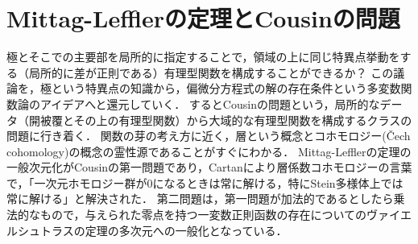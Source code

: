 \documentclass[uplatex, dvipdfmx]{jsreport}
\begin{document}
\section{Mittag-Lefflerの定理とCousinの問題}

\begin{tcolorbox}[colframe=ForestGreen, colback=ForestGreen!10!white,breakable,colbacktitle=ForestGreen!40!white,coltitle=black,fonttitle=\bfseries\sffamily,
title=]
    極とそこでの主要部を局所的に指定することで，領域の上に同じ特異点挙動をする（局所的に差が正則である）有理型関数を構成することができるか？
    この議論を，極という特異点の知識から，偏微分方程式の解の存在条件という多変数関数論のアイデアへと還元していく．
    するとCousinの問題という，局所的なデータ（開被覆とその上の有理型関数）から大域的な有理型関数を構成するクラスの問題に行き着く．
    関数の芽の考え方に近く，層という概念とコホモロジー(Čech cohomology)の概念の霊性源であることがすぐにわかる．
    Mittag-Lefflerの定理の一般次元化がCousinの第一問題であり，Cartanにより層係数コホモロジーの言葉で，「一次元ホモロジー群が$0$になるときは常に解ける，特にStein多様体上では常に解ける」と解決された．
    第二問題は，第一問題が加法的であるとしたら乗法的なもので，与えられた零点を持つ一変数正則函数の存在についてのヴァイエルシュトラスの定理の多次元への一般化となっている．
\end{tcolorbox}
\end{document}
